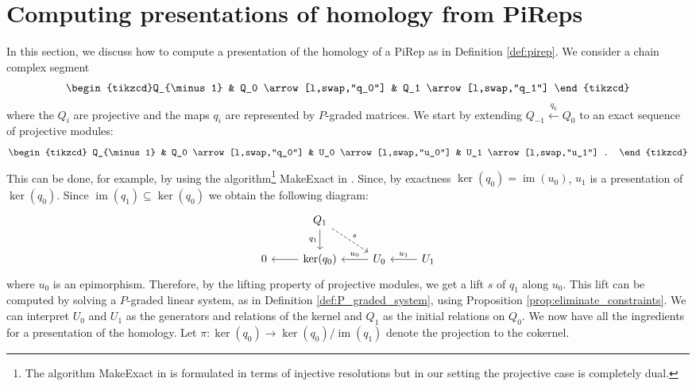 \documentclass[english,a4paper,nolineno,cleveref]{socg-lipics-v2021}
\DeclareMathOperator{\im}{im}
\begin{document}
\section{Computing presentations of homology from PiReps} \label{app:homology_presentation}

In this section, we discuss how to compute a presentation of the homology of a PiRep as in Definition \ref{def:pirep}. We consider a chain complex segment 
\begin{equation}\label{eq:segment_Q}
\begin{tikzcd}Q_{\minus 1} & Q_0 \arrow[l,swap,"q_0"] & Q_1 \arrow[l,swap,"q_1"] 
\end{tikzcd}
\end{equation}
where the $Q_i$ are projective and the maps $q_i$ are represented by $P$-graded matrices. We start by extending $Q_{\minus 1}\xleftarrow{q_0} Q_0$ to an exact sequence of projective modules:
\begin{equation}\label{eq:res_ker}
\begin{tikzcd}
Q_{\minus 1} & Q_0 \arrow[l,swap,"q_0"] & U_0 \arrow[l,swap,"u_0"] & U_1 \arrow[l,swap,"u_1"] .
\end{tikzcd}
\end{equation}
This can be done, for example, by using the algorithm\footnote{The algorithm {\sc MakeExact} in \cite{brown2024discretemicrolocalmorsetheory} is formulated in terms of injective resolutions but in our setting the projective case is completely dual.} {\sc MakeExact} in \cite{brown2024discretemicrolocalmorsetheory}.  Since, by exactness $\ker(q_0)=\im(u_0)$, $u_1$ is a presentation of $\ker(q_0)$. Since $\im(q_1)\subseteq \ker(q_0)$ we obtain the following diagram:
\begin{equation}\label{eq:ker_res_lift}
\begin{tikzcd}
& Q_1 \arrow[d,swap,"q_1"] \arrow[dr,dashed,"s"] \\
0 & \ker(q_0) \arrow[l] & U_0 \arrow[l,swap,"u_0"] & U_1 \arrow[l,swap,"u_1"]
\end{tikzcd}
\end{equation}
where $u_0$ is an epimorphism. Therefore, by the lifting property of projective modules, we get a lift $s$ of $q_1$ along $u_0$. This lift can be computed by solving a $P$-graded linear system, as in Definition \ref{def:P_graded_system}, using Proposition \ref{prop:eliminate_constraints}. We can interpret $U_0$ and $U_1$ as the generators and relations of the kernel and $Q_1$ as the initial relations on $Q_0$. We now have all the ingredients for a presentation of the homology. Let $\pi\colon \ker(q_0)\rightarrow \ker(q_0)/\im(q_1)$ denote the projection to the cokernel.
\end{document}
